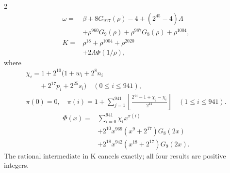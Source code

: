 \documentclass[10pt]{article}
\newcommand{\fl}[1]{\left\lfloor#1\right\rfloor}
\begin{document}
\begin{multicols}{2}
\begin{align*}
\omega={}&\beta+8G_{917}(\rho)-4+(2^{45}-4)\Lambda\\
&+\rho^{960}G_9(\rho)+\rho^{987}G_8(\rho)
  +\rho^{1004},\\
K={}&\rho^{18}+\rho^{1004}+\rho^{2020}\\
&+2\Lambda\Phi(1/\rho),
\end{align*}
where
\[
\begin{gathered}
\chi_i=1+2^{10}(1+w_i+2^8n_i\\
\qquad+2^{17}p_i+2^{25}s_i)\quad(0\le i\le941),\\
\pi(0)=0,\quad\pi(i)=1+\sum_{j=1}^{941}
\fl{\frac{2^{44}-1+\chi_j-\chi_i}{2^{44}}}\quad(1\le i\le941).
\end{gathered}
\]
\[
\begin{split}
\Phi(x)={}&\sum_{i=0}^{941}\chi_i x^{\pi(i)}\\
&+2^{10}x^{969}(x^9+2^{17})G_8(2x)\\
&+2^{18}x^{942}(x^{18}+2^{17})G_9(2x).
\end{split}
\]
The rational intermediate in K cancels exactly; all four results are positive integers.


\end{multicols}
\end{document}

